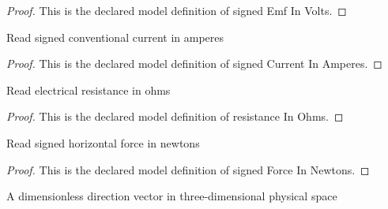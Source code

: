 \begin{proof}
  This is the declared model definition of signed Emf In Volts.
\end{proof}
\begin{definition}
  \label{def:physics:phyx-mini-0977:phyxminiproblems-problemphyxmini0977-signedcurrentinamperes}
  Read signed conventional current in amperes
\end{definition}
\begin{proof}
  This is the declared model definition of signed Current In Amperes.
\end{proof}
\begin{definition}
  \label{def:physics:phyx-mini-0977:phyxminiproblems-problemphyxmini0977-resistanceinohms}
  Read electrical resistance in ohms
\end{definition}
\begin{proof}
  This is the declared model definition of resistance In Ohms.
\end{proof}
\begin{definition}
  \label{def:physics:phyx-mini-0977:phyxminiproblems-problemphyxmini0977-signedforceinnewtons}
  Read signed horizontal force in newtons
\end{definition}
\begin{proof}
  This is the declared model definition of signed Force In Newtons.
\end{proof}
\begin{definition}
  \label{def:physics:phyx-mini-0977:phyxminiproblems-problemphyxmini0977-directionvector}
  A dimensionless direction vector in three-dimensional physical space
\end{definition}

